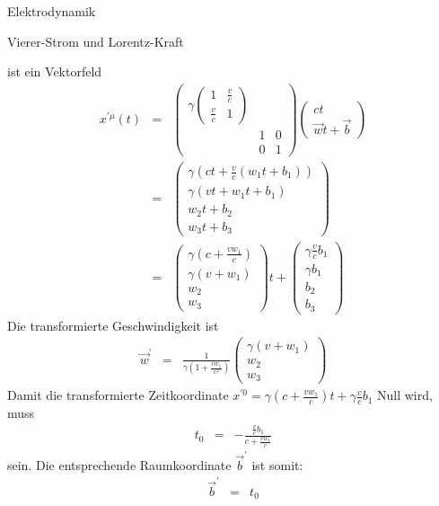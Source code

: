 \begin{chapter}{\titlestr}
\begin{section}{Elektrodynamik}
\begin{subsection}{Vierer-Strom und Lorentz-Kraft}
\begin{subsubsection}{ ist ein Vektorfeld}
\begin{eqnarray*}
x^{\prime\mu}(t) &=& 
\begin{pmatrix}
\gamma\begin{pmatrix}
1 & \frac{v}{c}\\
\frac{v}{c} & 1
\end{pmatrix} &   \\
& 1 & 0\\
& 0 & 1
\end{pmatrix}\begin{pmatrix}
ct\\ \vec{w}t+\vec{b}
\end{pmatrix}\\
&=&\begin{pmatrix}
\gamma \left(ct+\frac{v}{c}\left(w_1t+b_1\right)\right)\\
\gamma \left(vt+w_1t+b_1\right)\\
w_2t+b_2\\
w_3t+b_3
\end{pmatrix}\\
&=&
\begin{pmatrix}
\gamma \left(c+\frac{vw_1}{c}\right)\\
\gamma \left(v+w_1\right)\\
w_2\\
w_3
\end{pmatrix}t+
\begin{pmatrix}
\gamma \frac{v}{c}b_1\\
\gamma b_1\\
b_2\\
b_3
\end{pmatrix}
\end{eqnarray*}
Die transformierte Geschwindigkeit ist
\begin{eqnarray*}
\vec{w}^\prime &=& \frac{1}{\gamma \left(1+\frac{vw_1}{c^2}\right)}\begin{pmatrix}
\gamma \left(v+w_1\right)\\
w_2\\
w_3
\end{pmatrix}
\end{eqnarray*}
Damit die transformierte Zeitkoordinate $x^{\prime 0}=\gamma \left(c+\frac{vw_1}{c}\right)t+\gamma \frac{v}{c}b_1$ Null wird, muss
\begin{eqnarray*}
t_0 &=&-\frac{\frac{v}{c}b_1}{c+\frac{vw_1}{c}}
\end{eqnarray*}
sein. Die entsprechende Raumkoordinate $\vec{b}^\prime$ ist somit:
\begin{eqnarray*}
\vec{b}^\prime &=&t_0

\end{eqnarray*}
\end{subsubsection}
\end{subsection}
\end{section}
\end{chapter}
